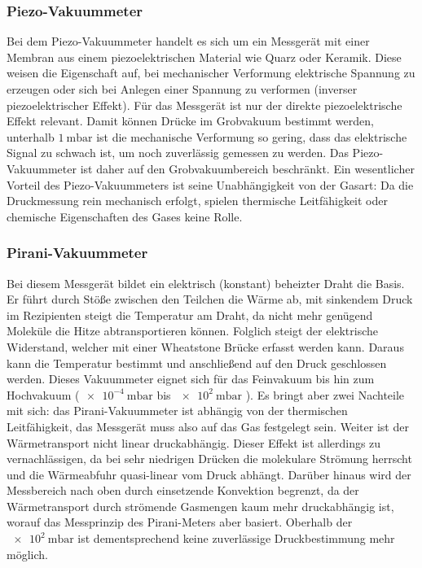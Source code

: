 \subsubsection{Piezo-Vakuummeter}
Bei dem Piezo-Vakuummeter handelt es sich um ein Messgerät mit einer Membran 
aus einem piezoelektrischen Material wie Quarz oder Keramik. Diese weisen die 
Eigenschaft auf, bei mechanischer Verformung elektrische Spannung zu erzeugen 
oder sich bei Anlegen einer Spannung zu verformen (inverser piezoelektrischer 
Effekt). Für das Messgerät ist nur der direkte piezoelektrische Effekt relevant.
Damit können Drücke im Grobvakuum bestimmt werden, unterhalb $\qty{1}{\milli\bar}$
ist die mechanische Verformung so gering, dass das elektrische Signal zu schwach 
ist, um noch zuverlässig gemessen zu werden. Das Piezo-Vakuummeter ist daher 
auf den Grobvakuumbereich beschränkt.
Ein wesentlicher Vorteil des Piezo-Vakuummeters ist seine Unabhängigkeit von
der Gasart: Da die Druckmessung rein mechanisch erfolgt, spielen thermische
Leitfähigkeit oder chemische Eigenschaften des Gases keine Rolle. \cite{glossar}

\subsubsection{Pirani-Vakuummeter}
Bei diesem Messgerät bildet ein elektrisch (konstant) beheizter Draht die Basis.
Er führt durch Stöße zwischen den Teilchen die Wärme ab, mit sinkendem Druck im 
Rezipienten steigt die Temperatur am Draht, da nicht mehr genügend Moleküle 
die Hitze abtransportieren können. Folglich steigt der elektrische Widerstand,
welcher mit einer Wheatstone Brücke erfasst werden kann. Daraus kann die 
Temperatur bestimmt und anschließend auf den Druck geschlossen werden. Dieses 
Vakuummeter eignet sich für das Feinvakuum bis hin zum Hochvakuum
($\qty{e-4}{\milli\bar}$ bis $\qty{e2}{\milli\bar}$ \cite{glossar}). Es bringt
aber zwei Nachteile mit sich: das Pirani-Vakuummeter ist abhängig von der 
thermischen Leitfähigkeit, das Messgerät muss also auf das Gas festgelegt sein. 
Weiter ist der Wärmetransport nicht linear druckabhängig. Dieser Effekt ist
allerdings zu vernachlässigen, da bei sehr niedrigen Drücken die molekulare
Strömung herrscht und die Wärmeabfuhr quasi-linear vom Druck abhängt. \cite{glossar}
Darüber hinaus wird der Messbereich nach oben durch einsetzende Konvektion begrenzt,
da der Wärmetransport durch strömende Gasmengen kaum mehr druckabhängig ist, 
worauf das Messprinzip des Pirani-Meters aber basiert. Oberhalb der
$\qty{e2}{\milli\bar}$ ist dementsprechend keine zuverlässige Druckbestimmung
mehr möglich.

